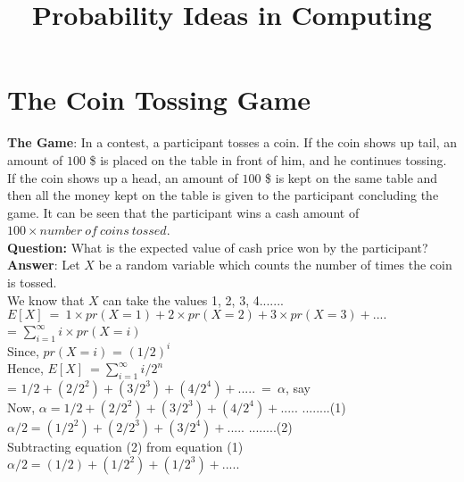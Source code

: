 \documentclass{book}
\title{Probability Ideas in Computing}
\begin{document}
\chapter{The Coin Tossing Game}
\textbf{The Game}: In a contest, a participant tosses a coin. If the coin shows up tail, an amount of $100$ \$ is placed on the table in front of him, and he continues tossing. If the coin shows up a head, an amount of $100$ \$ is kept on the same table and then all the money kept on the table is given to the participant concluding the game. It can be seen that the participant wins a cash amount of $100 \times number\ of\ coins\ tossed$. \\

\textbf{Question:} What is the expected value of cash price won by the participant?\\

\textbf{Answer}: 
Let $X$ be a random variable which counts the number of times the coin is tossed.\\

We know that $X$ can take the values 1, 2, 3, 4.......\\
$E[X]\ =\ 1 \times pr(X=1) + 2 \times pr(X=2) + 3 \times pr(X=3)+ .... $\\

= $\sum_{i=1}^{\infty} i \times pr(X=i) $\\

Since, $ pr(X=i) $ = $(1/2)^i$\\

Hence, $E[X]\ = \sum_{i=1}^{\infty} i/2^{n} $\\

= $1/2+(2/2^2)+(3/2^3)+(4/2^4)+.....\ =\ \alpha$, say\\

Now, $\alpha = 1/2+(2/2^2)+(3/2^3)+(4/2^4)+.....$ \hspace{5mm} ........(1)\\

$\alpha/2 = (1/2^2)+(2/2^3)+(3/2^4)+.....$\hspace{5mm} ........(2)\\

Subtracting equation (2) from equation (1) \\

$\alpha/2= (1/2)+(1/2^2)+(1/2^3)+.....$\\
\end{document}
